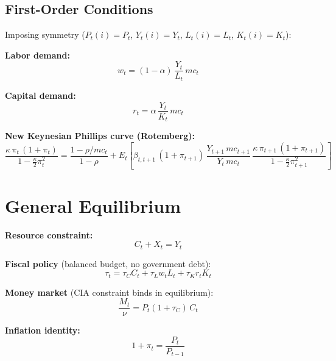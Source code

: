 \documentclass[11pt, a4paper]{article}
\begin{document}
\subsection*{First-Order Conditions}

Imposing symmetry ($P_t(i)=P_t$, $Y_t(i)=Y_t$, $L_t(i)=L_t$, $K_t(i)=K_t$):

\textbf{Labor demand:}
\begin{equation}
    w_t = (1-\alpha)\,\frac{Y_t}{L_t}\,mc_t
    \label{eq:labor_demand}
\end{equation}

\textbf{Capital demand:}
\begin{equation}
    r_t = \alpha\,\frac{Y_t}{K_t}\,mc_t
    \label{eq:capital_demand}
\end{equation}

\textbf{New Keynesian Phillips curve (Rotemberg):}
\begin{equation}
    \frac{\kappa\,\pi_t\,(1+\pi_t)}{1-\frac{\kappa}{2}\pi_t^2}
    =
    \frac{1 - \rho / mc_t}{1-\rho}
    +
    E_t\!\left[
        \beta_{t,t+1}\,(1+\pi_{t+1})\,\frac{Y_{t+1} \, mc_{t+1}}{Y_t \, mc_t}\,
        \frac{\kappa\,\pi_{t+1}\,(1+\pi_{t+1})}{1-\frac{\kappa}{2}\pi_{t+1}^2}
    \right]
    \label{eq:phillips}
\end{equation}

\section{General Equilibrium}

\textbf{Resource constraint:}
\begin{equation}
    C_t + X_t = Y_t
    \label{eq:resource}
\end{equation}

\textbf{Fiscal policy} (balanced budget, no government debt):
\begin{equation}
    \tau_t = \tau_C C_t + \tau_L w_t L_t + \tau_K r_t K_t
    \label{eq:fiscal}
\end{equation}

\textbf{Money market} (CIA constraint binds in equilibrium):
\begin{equation}
    \frac{M_t}{\nu} = P_t(1+\tau_C)\,C_t
    \label{eq:money_market}
\end{equation}

\textbf{Inflation identity:}
\begin{equation}
    1 + \pi_t = \frac{P_t}{P_{t-1}}
    \label{eq:inflation}
\end{equation}
\end{document}
